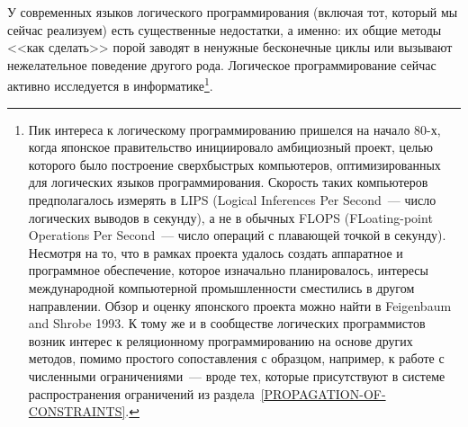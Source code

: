 У современных языков логического программирования (включая
тот, который мы сейчас реализуем) есть существенные недостатки, а
именно: их общие методы <<как сделать>> порой заводят в ненужные
бесконечные циклы или вызывают нежелательное поведение другого рода.
Логическое программирование сейчас активно исследуется в
информатике\footnote{Пик интереса к логическому программированию 
пришелся на начало 80-х, когда японское правительство инициировало амбициозный
проект, целью которого было построение
сверхбыстрых
компьютеров, оптимизированных для логических языков программирования.  Скорость
таких компьютеров предполагалось измерять в LIPS (Logical Inferences
Per Second~--- число логических выводов в секунду), а не в обычных FLOPS
(FLoating-point Operations Per Second~--- число операций с плавающей
точкой в секунду).  Несмотря на то, что в рамках проекта удалось
создать аппаратное и программное обеспечение, которое изначально
планировалось, интересы международной компьютерной промышленности сместились
в другом направлении.  Обзор и оценку японского проекта
можно найти в Feigenbaum and Shrobe 1993.
К тому же и в сообществе логических программистов возник интерес к реляционному
программированию на основе других методов, помимо простого
сопоставления с образцом, например, к работе с численными
ограничениями~--- вроде тех, которые присутствуют в системе
распространения ограничений из 
раздела~\ref{PROPAGATION-OF-CONSTRAINTS}.}.

